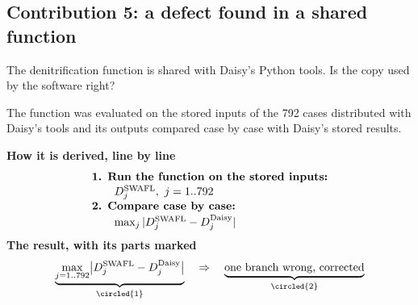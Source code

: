 \subsection{Contribution 5: a defect found in a shared function}
\begin{problem}
The denitrification function is shared with Daisy's Python tools. Is the copy used by the software right?
\end{problem}
\begin{derivation}
The function was evaluated on the stored inputs of the 792 cases distributed with Daisy's tools and its outputs compared case by case with Daisy's stored results.
\end{derivation}
\begin{keyresult}
\begin{pencil}
{\small\noindent\textbf{How it is derived, line by line}
\[\begin{array}{@{}l@{}}\textbf{1. Run the function on the stored inputs:}\\[1pt]
\qquad D_j^{\text{SWAFL}},\ j=1..792\\[1pt]
\textbf{2. Compare case by case:}\\[1pt]
\qquad \max_j|D_j^{\text{SWAFL}}-D_j^{\text{Daisy}}|
\end{array}\]}
\noindent\textbf{The result, with its parts marked}
\[\underbrace{\max_{j=1..792}\bigl|D_j^{\text{SWAFL}}-D_j^{\text{Daisy}}\bigr|}_{\circled{1}}\quad\Rightarrow\quad\underbrace{\text{one branch wrong, corrected}}_{\circled{2}}\]
\end{pencil}
\end{keyresult}
\begin{pins}
\end{pins}

